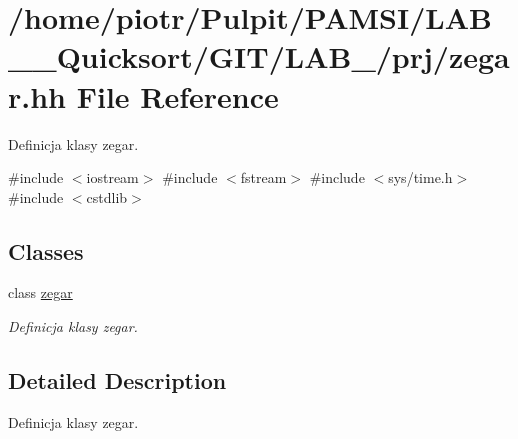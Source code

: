 \hypertarget{zegar_8hh}{\section{/home/piotr/\-Pulpit/\-P\-A\-M\-S\-I/\-L\-A\-B\-\_\-\_\-\-Quicksort/\-G\-I\-T/\-L\-A\-B\-\_/prj/zegar.hh \-File \-Reference}
\label{zegar_8hh}
}


\-Definicja klasy zegar.  


{\ttfamily \#include $<$iostream$>$}\*
{\ttfamily \#include $<$fstream$>$}\*
{\ttfamily \#include $<$sys/time.\-h$>$}\*
{\ttfamily \#include $<$cstdlib$>$}\*
\subsection*{\-Classes}
\begin{DoxyCompactItemize}
\item 
class \hyperlink{classzegar}{zegar}
\begin{DoxyCompactList}\small\item\em \-Definicja klasy zegar. \end{DoxyCompactList}\end{DoxyCompactItemize}


\subsection{\-Detailed \-Description}
\-Definicja klasy zegar. 